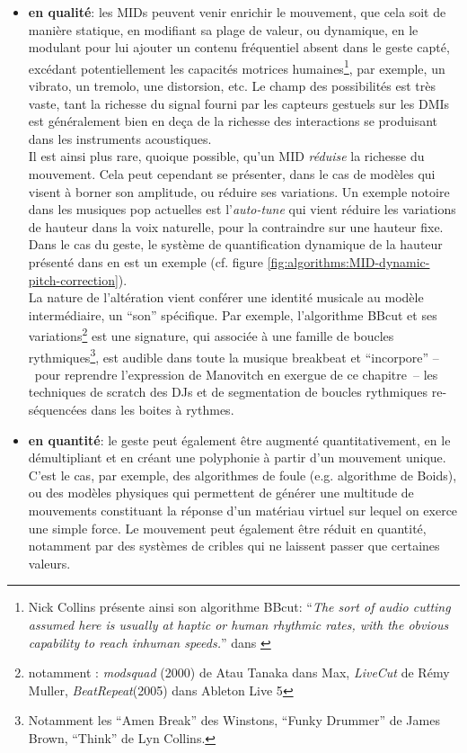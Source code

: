 \begin{itemize}[noitemsep]
	\item \textbf{en qualité}: les MIDs peuvent venir enrichir le mouvement, que cela soit de manière statique, en modifiant sa plage de valeur, ou dynamique, en le modulant pour lui ajouter un contenu fréquentiel absent dans le geste capté, excédant potentiellement les capacités motrices humaines\footnote{Nick Collins présente ainsi son algorithme BBcut: ``\textit{The sort of audio cutting assumed here is usually at haptic or human rhythmic rates, with the obvious capability to reach inhuman speeds.}'' dans \cite{collins_bbcut_2002}}, par exemple, un vibrato, un tremolo, une distorsion, etc. Le champ des possibilités est très vaste, tant la richesse du signal fourni par les capteurs gestuels sur les \glspl{DMI} est généralement bien en deça de la richesse des interactions se produisant dans les instruments acoustiques.\\
	\indent Il est ainsi plus rare, quoique possible, qu'un MID \textit{réduise} la richesse du mouvement. Cela peut cependant se présenter, dans le cas de modèles qui visent à borner son amplitude, ou réduire ses variations. Un exemple notoire dans les musiques pop actuelles est l'\textit{auto-tune} qui vient réduire les variations de hauteur dans la voix naturelle, pour la contraindre sur une hauteur fixe. Dans le cas du geste, le système de quantification dynamique de la hauteur présenté dans \cite{goudard_playing_2014} en est un exemple (cf. figure \ref{fig:algorithms:MID-dynamic-pitch-correction}).\\
	\indent La nature de l'altération vient conférer une identité musicale au modèle intermédiaire, un ``son'' spécifique. Par exemple, l'algorithme BBcut \cite{collins_bbcut_2002} et ses variations\footnote{notamment : \textit{modsquad} (2000) de Atau Tanaka dans Max, \textit{LiveCut} de Rémy Muller, \textit{BeatRepeat}(2005) dans Ableton Live 5} est une signature, qui associée à une famille de boucles rythmiques\footnote{Notamment les ``Amen Break'' des Winstons, ``Funky Drummer'' de James Brown, ``Think'' de Lyn Collins.}, est audible dans toute la musique breakbeat et ``incorpore'' --~pour reprendre l'expression de Manovitch en exergue de ce chapitre~-- les techniques de scratch des DJs et de segmentation de boucles rythmiques re-séquencées dans les boites à rythmes.

	\item \textbf{en quantité}: le geste peut également être augmenté quantitativement, en le démultipliant et en créant une polyphonie à partir d'un mouvement unique. C'est le cas, par exemple, des algorithmes de foule (e.g. algorithme de Boids), ou des modèles physiques qui permettent de générer une multitude de mouvements constituant la réponse d'un matériau virtuel sur lequel on exerce une simple force. Le mouvement peut également être réduit en quantité, notamment par des systèmes de cribles qui ne laissent passer que certaines valeurs.
	

\end{itemize}

